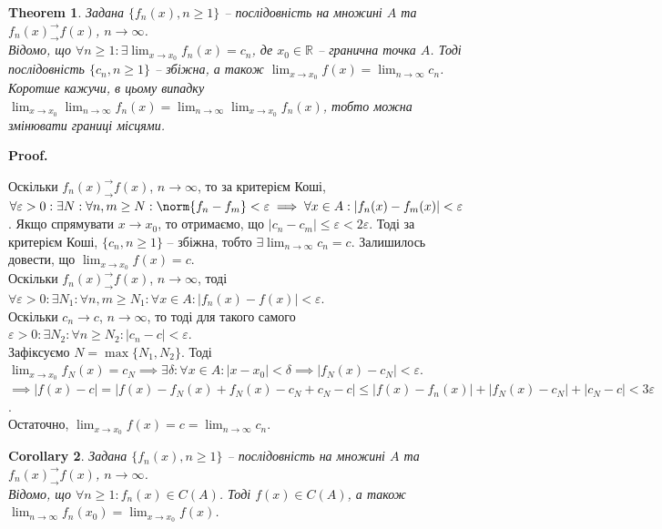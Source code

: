 \documentclass[a4paper, 10pt]{article}
\makeatletter
\def\huge{\displaystyle}
\theoremstyle{theoremdd}
\newtheorem{theorem}{Theorem}[subsection]
\theoremstyle{theoremdd}
\theoremstyle{theoremdd}
\theoremstyle{theoremdd}
\theoremstyle{theoremdd}
\theoremstyle{theoremdd}
\theoremstyle{theoremdd}
\theoremstyle{theoremdd}
\theoremstyle{theoremdd}
\newtheorem{corollary}[theorem]{Corollary}
\renewenvironment{proof}[1][Proof.\\]{\par
\pushQED{\hfill \qed}%
\normalfont \topsep6\p@\@plus6\p@\relax
\trivlist
\item\relax
{\bfseries
#1\@addpunct{.}}\hspace\labelsep\ignorespaces
}{%
\popQED\endtrivlist\@endpefalse
}
\makeatother
\begin{document}
\begin{theorem}
\label{limit_of_funcitonal_sequence}
Задана $\{f_n(x), n \geq 1\}$ -- послідовність на множині $A$ та $f_n(x)^\rightarrow_\rightarrow f(x)$, $n \to \infty$.\\
Відомо, що $\forall n \geq 1: \exists\huge\lim_{x \to x_0} f_n(x) = c_n$, де $x_0 \in \mathbb{R}$ -- гранична точка $A$. Тоді послідовність $\{c_n, n \geq 1\}$ -- збіжна, а також $\huge\lim_{x \to x_0} f(x) = \lim_{n \to \infty} c_n$.\\
Коротше кажучи, в цьому випадку $\displaystyle\lim_{x \to x_0} \lim_{n \to \infty} f_n(x) = \lim_{n \to \infty} \lim_{x \to x_0} f_n(x)$, тобто можна змінювати границі місцями.
\end{theorem}

\begin{proof}
Оскільки $f_n(x)^\rightarrow_\rightarrow f(x)$, $n \to \infty$, то за критерієм Коші,
$\forall \varepsilon > 0: \exists N: \forall n,m \geq N: \norm{f_n-f_m} < \varepsilon \implies \forall x \in A: |f_n(x) - f_m(x)| < \varepsilon$. Якщо спрямувати $x \to x_0$, то отримаємо, що $|c_n - c_m| \leq \varepsilon < 2 \varepsilon$. Тоді за критерієм Коші, $\{c_n, n \geq 1\}$ -- збіжна, тобто $\exists \huge\lim_{n \to \infty} c_n = c$. Залишилось довести, що $\huge\lim_{x \to x_0} f(x) = c$.\\
Оскільки $f_n(x)^\rightarrow_\rightarrow f(x)$, $n \to \infty$, тоді $\forall \varepsilon > 0: \exists N_1: \forall n,m \geq N_1: \forall x \in A: |f_n(x) - f(x)| < \varepsilon$.\\
Оскільки $c_n \to c$, $n \to \infty$, то тоді для такого самого $\varepsilon > 0: \exists N_2: \forall n \geq N_2: |c_n - c| < \varepsilon$.\\
Зафіксуємо $N = \max \{N_1,N_2\}$. Тоді $\huge\lim_{x \to x_0} f_N(x) = c_N \implies \exists \delta: \forall x \in A: |x-x_0| < \delta \implies |f_N(x) - c_N| < \varepsilon$.\\
$\implies |f(x) - c| = |f(x) - f_N(x) + f_N(x) - c_N + c_N - c| \leq |f(x) - f_n(x)| + |f_N(x) - c_N| + |c_N-c| < 3 \varepsilon$.\\
Остаточно, $\huge\lim_{x \to x_0} f(x) = c = \lim_{n \to \infty} c_n$.
\end{proof}

\begin{corollary}
Задана $\{f_n(x), n \geq 1\}$ -- послідовність на множині $A$ та $f_n(x)^\rightarrow_\rightarrow f(x)$, $n \to \infty$.\\
Відомо, що $\forall n \geq 1: f_n(x) \in C(A)$. Тоді $f(x) \in C(A)$, а також $\huge\lim_{n \to \infty} f_n(x_0) = \lim_{x \to x_0} f(x)$.
\end{corollary}
\end{document}
